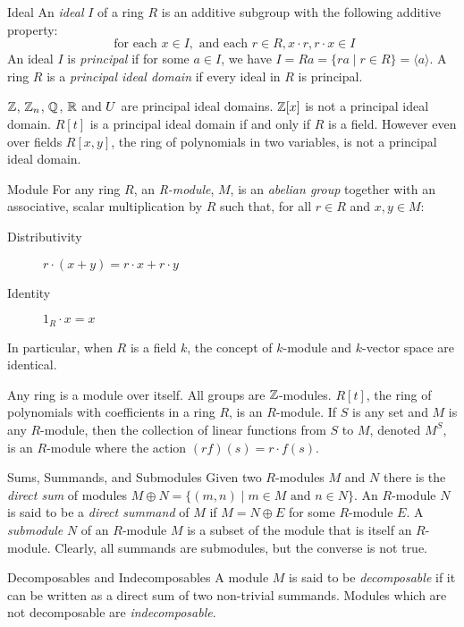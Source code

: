 \begin{definition}{Ideal}
An \emph{ideal} $I$ of a ring $R$ is an additive subgroup with the following additive property:
\[ \textrm{ for each } x \in I, \textrm{ and each } r \in R, x \cdot r, r \cdot x \in I  \]
An ideal $I$ is \emph{principal} if for some $a \in I$, we have $I = Ra =\{ ra \mid r \in R\} = \langle a \rangle$.
A ring $R$ is a \emph{principal ideal domain} if every ideal in $R$ is principal.
\end{definition}
\begin{example}
$\mathbb{Z}$, $\mathbb{Z}_n$, $\mathbb{Q}$, $\mathbb{R}$ and $U$ are principal ideal domains. $\mathbb{Z}[x]$ is not a principal ideal domain. $R[t]$ is a principal ideal domain if and only if $R$ is a field. However
even over fields $R[x,y]$, the ring of polynomials in two variables, is not a principal ideal domain.
\end{example}
\begin{definition}{Module}
For any ring $R$, an \emph{R-module}, $M$, is an \emph{abelian group} together with an associative, scalar multiplication by $R$ such that, for all $r \in R$ and $x,y \in M$:
\begin{description}
\item[Distributivity]  $r \cdot (x + y)  = r \cdot x + r \cdot y$
\item[Identity] $1_R \cdot x = x$
\end{description}
\end{definition}
In particular, when $R$ is a field $k$, the concept of $k$-module and $k$-vector space are identical.
\begin{example}
Any ring is a module over itself.  All groups are $\mathbb{Z}$-modules. $R[t]$, the ring of polynomials with coefficients in a ring $R$, is an $R$-module. If $S$ is any set and $M$ is any $R$-module, then the collection of linear functions from $S$ to $M$, denoted $M^S$, is an $R$-module where the action $(rf)(s) =  r \cdot f(s)$.
\end{example}
\begin{definition}{Sums, Summands, and Submodules}
Given two $R$-modules $M$ and $N$ there is the \emph{direct sum} of modules $M \oplus N = \{ (m,n) \mid m \in M \textrm{ and } n \in N \}$.
An $R$-module $N$ is said to be a \emph{direct summand} of $M$ if $M = N \oplus E$ for some $R$-module $E$. 
A \emph{submodule} $N$ of an $R$-module $M$ is a subset of the module that is itself an $R$-module. Clearly, all summands are submodules, but the converse is not true.
\end{definition}
\begin{definition}{Decomposables and Indecomposables}
A module $M$ is said to be \emph{decomposable} if it can be written as a direct sum of two non-trivial summands. Modules which are not decomposable are \emph{indecomposable}. 
\end{definition}
